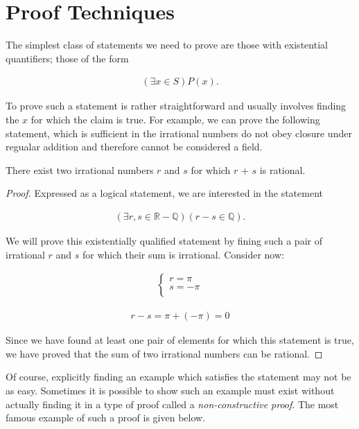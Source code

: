 \documentclass{report}
\begin{document}
\section{Proof Techniques}

The simplest class of statements we need to prove are those with existential quantifiers; those of the form

\begin{align*}
	(\exists x \in S)P(x).
\end{align*}

To prove such a statement is rather straightforward and usually involves finding the $x$ for which the claim is true. For example, we can prove the following statement, which is sufficient in the irrational numbers do not obey closure under regualar addition and therefore cannot be considered a field.

\vspace{\baselineskip}
\begin{theorem}
	There exist two irrational numbers $r$ and $s$ for which $r$ + $s$ is rational.
\end{theorem}
\begin{proof}
	Expressed as a logical statement, we are interested in the statement
	
	\begin{align*}
		(\exists r, s \in \mathbb{R} - \mathbb{Q})(r - s \in \mathbb{Q}).
	\end{align*}
	
	We will prove this existentially qualified statement by fining such a pair of irrational $r$ and $s$ for which their sum is irrational. Consider now:
	
	\begin{align*}
		\begin{cases}
			r = \pi \\
			s = -\pi \\
		\end{cases}
	\end{align*}
	
	\begin{align*}
		r - s = \pi + (-\pi) = 0
	\end{align*}
	
	Since we have found at least one pair of elements for which this statement is true, we have proved that the sum of two irrational numbers can be rational.
\end{proof}
\vspace{\baselineskip}

Of course, explicitly finding an example which satisfies the statement may not be as easy. Sometimes it is possible to show such an example must exist without actually finding it in a type of proof called a \emph{non-constructive proof}.  The most famous example of such a proof is given below.
\end{document}
